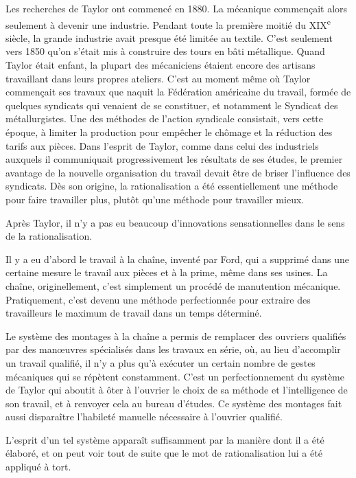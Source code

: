 \documentclass[french,twoside]{book} %
\begin{document}
Les recherches de Taylor ont commencé en 1880. La mécanique commençait alors seulement à devenir une industrie. Pendant toute la première moitié du XIX\textsuperscript{e} siècle, la grande industrie avait presque été limitée au textile. C'est seulement vers 1850 qu'on s'était mis à construire des tours en bâti métallique. Quand Taylor était enfant, la plupart des mécaniciens étaient encore des artisans travaillant dans leurs propres ateliers. C'est au moment même où Taylor commençait ses travaux que naquit la Fédération américaine du travail, formée de quelques syndicats qui venaient de se constituer, et notamment le Syndicat des métallurgistes. Une des méthodes de l'action syndicale consistait, vers cette époque, à limiter la production pour empêcher le chômage et la réduction des tarifs aux pièces. Dans l'esprit de Taylor, comme dans celui des industriels auxquels il communiquait progressivement les résultats de ses études, le premier avantage de la nouvelle organisation du travail devait être de briser l'influence des syndicats. Dès son origine, la rationalisation a été essentiellement une méthode pour faire travailler plus, plutôt qu'une méthode pour travailler mieux.\par
Après Taylor, il n'y a pas eu beaucoup d'innovations sensationnelles dans le sens de la rationalisation.\par
\par
Il y a eu d'abord le travail à la chaîne, inventé par Ford, qui a supprimé dans une certaine mesure le travail aux pièces et à la prime, même dans ses usines. La chaîne, originellement, c'est simplement un procédé de manutention mécanique. Pratiquement, c'est devenu une méthode perfectionnée pour extraire des travailleurs le maximum de travail dans un temps déterminé.\par
Le système des montages à la chaîne a permis de remplacer des ouvriers qualifiés par des manœuvres spécialisés dans les travaux en série, où, au lieu d'accomplir un travail qualifié, il n'y a plus qu'à exécuter un certain nombre de gestes mécaniques qui se répètent constamment. C'est un perfectionnement du système de Taylor qui aboutit à ôter à l'ouvrier le choix de sa méthode et l'intelligence de son travail, et à renvoyer cela au bureau d'études. Ce système des montages fait aussi disparaître l'habileté manuelle nécessaire à l'ouvrier qualifié.\par
L'esprit d'un tel système apparaît suffisamment par la manière dont il a été élaboré, et on peut voir tout de suite que le mot de rationalisation lui a été appliqué à tort.\par
\end{document}
